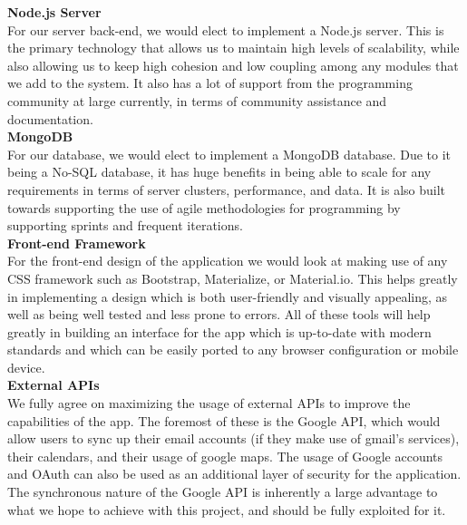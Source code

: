 \documentclass[12pt]{article}
\begin{document}
	\textbf{Node.js Server}\\
	For our server back-end, we would elect to implement a Node.js server. This is the primary technology that allows us to maintain high levels of scalability, while also allowing us to keep high cohesion and low coupling among any modules that we add to the system. It also has a lot of support from the programming community at large currently, in terms of community assistance and documentation. \\
	
	\textbf{MongoDB}\\
	For our database, we would elect to implement a MongoDB database. Due to it being a No-SQL database, it has huge benefits in being able to scale for any requirements in terms of server clusters, performance, and data. It is also built towards supporting the use of agile methodologies for programming by supporting sprints and frequent iterations.\\
	
	\newpage
	\textbf{Front-end Framework}\\
	For the front-end design of the application we would look at making use of any CSS framework such as Bootstrap, Materialize, or Material.io. This helps greatly in implementing a design which is both user-friendly and visually appealing, as well as being well tested and less prone to errors. All of these tools will help greatly in building an interface for the app which is up-to-date with modern standards and which can be easily ported to any browser configuration or mobile device.\\
	
	\textbf{External APIs}\\
	We fully agree on maximizing the usage of external APIs to improve the capabilities of the app. The foremost of these is the Google API, which would allow users to sync up their email accounts (if they make use of gmail's services), their calendars, and their usage of google maps. The usage of Google accounts and OAuth can also be used as an additional layer of security for the application. The synchronous nature of the Google API is inherently a large advantage to what we hope to achieve with this project, and should be fully exploited for it.\\
	
\end{document}
